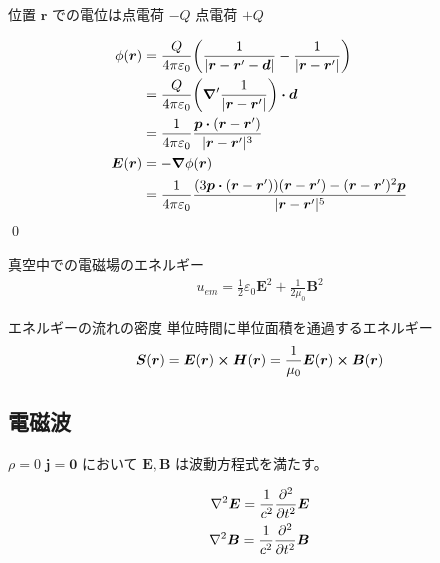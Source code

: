 \documentclass[uplatex,dvipdfmx,a4paper,11pt]{jlreq}
\makeatletter
\newcommand{\EE}{\bm{E}}
\newcommand{\BB}{\bm{B}}
\newcommand{\rr}{\bm{r}}
\newcommand{\pp}{\bm{p}}
\theoremstyle{definition}
\renewenvironment{proof}[1][\proofname]{\par
  \normalfont
  \topsep6\p@\@plus6\p@ \trivlist
  \item[\hskip\labelsep{\bfseries #1}\@addpunct{\bfseries}]\ignorespaces\quad\par
}{%
  \qed\endtrivlist\@endpefalse
}
\renewcommand\proofname{証明}
\makeatother
\begin{document}
\begin{proposition}[電気双極子]
  位置 $\rr$ での電位は点電荷 $-Q$ 点電荷 $+Q$
\end{proposition}
\begin{proof}
  \begin{align}
    \phi(\rr) & = \frac{Q}{4\pi\varepsilon_0}\qty(\frac{1}{|\rr - \rr' - \bm{d}|} - \frac{1}{|\rr - \rr'|})                     \\
              & = \frac{Q}{4\pi\varepsilon_0}\qty(\vnabla'\frac{1}{|\rr - \rr'|})\vdot\bm{d}                                    \\
              & = \frac{1}{4\pi\varepsilon_0}\frac{\pp\vdot(\rr - \rr')}{|\rr - \rr'|^3}                                        \\
    \EE(\rr)  & = -\vnabla\phi(\rr)                                                                                             \\
              & = \frac{1}{4\pi\varepsilon_0}\frac{\qty(3\pp\vdot(\rr - \rr'))(\rr - \rr') - (\rr - \rr')^2\pp}{|\rr - \rr'|^5}
  \end{align}
\end{proof}

\begin{proposition}[極座標で表した電気双極子]
\end{proposition}

\begin{theorem}
  真空中での電磁場のエネルギー
  \begin{align}
    u_{em} = \frac{1}{2}\varepsilon_0\EE^2 + \frac{1}{2\mu_0}\BB^2
  \end{align}
\end{theorem}

\begin{definition}
  エネルギーの流れの密度
  単位時間に単位面積を通過するエネルギー
  \begin{align}
    \bm{S}(\rr) = \EE(\rr)\cross\bm{H}(\rr) = \frac{1}{\mu_0}\EE(\rr)\cross\BB(\rr)
  \end{align}
\end{definition}

\newcommand{\Et}{\tilde{E}}
\newcommand{\ET}{\tilde{\bm{E}}}
\newcommand{\Ec}{\mathcal{E}}
\newcommand{\EC}{\vb*{\mathcal{E}}}
\newcommand{\LL}{\bm{L}}
\newcommand{\ee}{\bm{\epsilon}}
\renewcommand{\SS}{\bm{S}}
\newcommand{\JJ}{\bm{J}}
\subsection{電磁波}
\begin{proposition}
  $\rho = 0$ $\bm{j} = \bm{0}$ において $\EE, \BB$ は波動方程式を満たす。
\end{proposition}
\begin{align}
  \nabla^2\EE = \frac{1}{c^2}\pdv[2]{t}\EE \\
  \nabla^2\BB = \frac{1}{c^2}\pdv[2]{t}\BB
\end{align}
\end{document}
